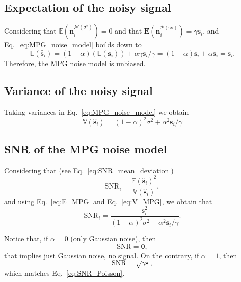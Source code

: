 \subsection{Expectation of the noisy signal}
Considering that $\mathbb{E}(\mathbf{n}^{\mathcal{N}(\sigma^2)}_i)=0$
and that
$\mathbf{E}(\mathbf{n}^{\mathcal{P}(\gamma\mathbf{s})}_i)=\gamma\mathbf{s}_i$, and Eq.~\ref{eq:MPG_noise_model} boilds down to
\begin{equation}
  \mathbb{E}(\hat{\mathbf{s}}_i) = (1-\alpha)(\mathbb{E}(\mathbf{s}_i)) + \alpha\gamma\mathbf{s}_i/\gamma = (1-\alpha)\mathbf{s}_i + \alpha\mathbf{s}_i = \mathbf{s}_i.
  \label{eq:E_MPG}
\end{equation}
Therefore, the \gls{MPG} noise model is unbiased.

\subsection{Variance of the noisy signal}
Taking variances in Eq.~\ref{eq:MPG_noise_model} we obtain
\begin{equation}
  \mathbb{V}(\hat{\mathbf{s}}_i) = (1-\alpha)^2\sigma^2 + \alpha^2\mathbf{s}_i/\gamma
  \label{eq:V_MPG}
\end{equation}

\subsection{SNR of the MPG noise model}
Considering that (see Eq.~\ref{eq:SNR_mean_deviation})
\begin{equation}
  \text{SNR}_i = \frac{\mathbb{E}(\hat{\mathbf{s}}_i)^2}{\mathbb{V}(\hat{\mathbf{s}}_i)},
\end{equation}
and using Eq.~\ref{eq:E_MPG} and Eq.~\ref{eq:V_MPG}, we obtain that
\begin{equation}
  \text{SNR}_i = \frac{\mathbf{s}_i^2}{(1-\alpha)^2\sigma^2 + \alpha^2\mathbf{s}_i/\gamma}.
  \label{eq:SNR_MPG}
\end{equation}

Notice that, if $\alpha=0$ (only Gaussian noise), then
\begin{equation}
  \text{SNR} = \mathbf{0},
\end{equation}
that implies just Gaussian noise, no signal. On the contrary, if
$\alpha=1$, then
\begin{equation}
  \text{SNR} = \sqrt{\gamma\mathbf{s}},
\end{equation}
which matches Eq.~\ref{eq:SNR_Poisson}.

